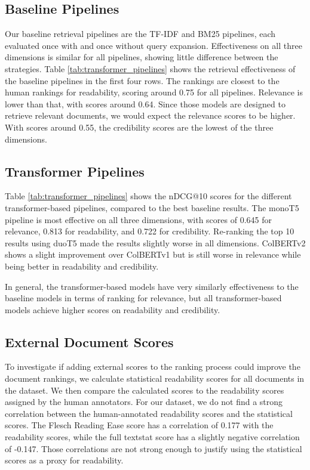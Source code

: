 \subsection{Baseline Pipelines}
Our baseline retrieval pipelines are the TF-IDF and BM25 pipelines, each evaluated once with and once without query expansion.
Effectiveness on all three dimensions is similar for all pipelines, showing little difference between the strategies.
Table \ref{tab:transformer_pipelines} shows the retrieval effectiveness of the baseline pipelines in the first four rows.
The rankings are closest to the human rankings for readability, scoring around 0.75 for all pipelines.
Relevance is lower than that, with scores around 0.64.
Since those models are designed to retrieve relevant documents, we would expect the relevance scores to be higher.
With scores around 0.55, the credibility scores are the lowest of the three dimensions.

\subsection{Transformer Pipelines}
Table \ref{tab:transformer_pipelines} shows the nDCG@10 scores for the different transformer-based pipelines, compared to the best baseline results.
The monoT5 pipeline is most effective on all three dimensions, with scores of 0.645 for relevance, 0.813 for readability, and 0.722 for credibility.
Re-ranking the top 10 results using duoT5 made the results slightly worse in all dimensions.
ColBERTv2 shows a slight improvement over ColBERTv1 but is still worse in relevance while being better in readability and credibility.

In general, the transformer-based models have very similarly effectiveness to the baseline models in terms of ranking for relevance, but all transformer-based models achieve higher scores on readability and credibility.

\subsection{External Document Scores}
To investigate if adding external scores to the ranking process could improve the document rankings, we calculate statistical readability scores for all documents in the dataset.
We then compare the calculated scores to the readability scores assigned by the human annotators.
For our dataset, we do not find a strong correlation between the human-annotated readability scores and the statistical scores.
The Flesch Reading Ease score has a correlation of 0.177 with the readability scores, while the full textstat score has a slightly negative correlation of -0.147.
Those correlations are not strong enough to justify using the statistical scores as a proxy for readability.


